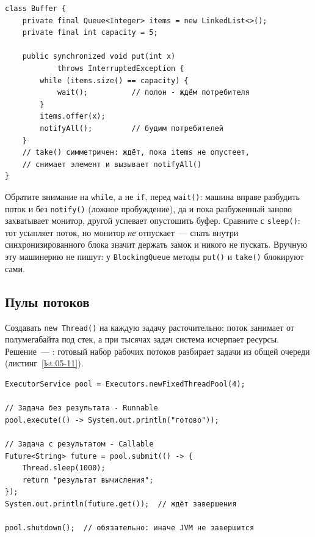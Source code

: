 \begin{listing}[H]
\begin{verbatim}
class Buffer {
    private final Queue<Integer> items = new LinkedList<>();
    private final int capacity = 5;

    public synchronized void put(int x)
            throws InterruptedException {
        while (items.size() == capacity) {
            wait();          // полон - ждём потребителя
        }
        items.offer(x);
        notifyAll();         // будим потребителей
    }
    // take() симметричен: ждёт, пока items не опустеет,
    // снимает элемент и вызывает notifyAll()
}
\end{verbatim}
\caption{Буфер производителя и потребителя}
\label{lst:05-10}
\end{listing}

Обратите внимание на \texttt{while}, а не \texttt{if}, перед \texttt{wait()}:
машина вправе разбудить поток и без \texttt{notify()} (ложное пробуждение), да и
пока разбуженный заново захватывает монитор, другой успевает опустошить буфер.
Сравните с \texttt{sleep()}: тот усыпляет поток, но монитор \emph{не}
отпускает~--- спать внутри синхронизированного блока значит держать замок и
никого не пускать. Вручную эту машинерию не пишут: у \texttt{BlockingQueue}
методы \texttt{put()} и \texttt{take()} блокируют сами.

\subsection{Пулы потоков}

Создавать \texttt{new Thread()} на каждую задачу расточительно: поток занимает
от полумегабайта под стек, а при тысячах задач система исчерпает ресурсы.
Решение~--- : готовый набор рабочих потоков разбирает задачи
из общей очереди (листинг~\ref{lst:05-11}).

\begin{listing}[H]
\begin{verbatim}
ExecutorService pool = Executors.newFixedThreadPool(4);

// Задача без результата - Runnable
pool.execute(() -> System.out.println("готово"));

// Задача с результатом - Callable
Future<String> future = pool.submit(() -> {
    Thread.sleep(1000);
    return "результат вычисления";
});
System.out.println(future.get());  // ждёт завершения

pool.shutdown();  // обязательно: иначе JVM не завершится
\end{verbatim}
\caption{Пул потоков и получение результата задачи}
\label{lst:05-11}
\end{listing}

